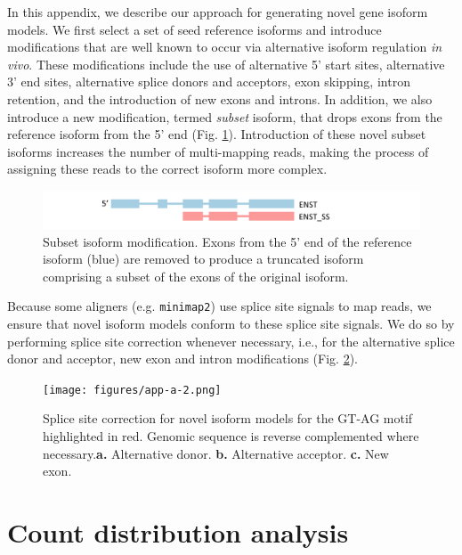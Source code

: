 In this appendix, we describe our approach for generating novel gene isoform models. We first select a set of seed reference isoforms and introduce modifications that are well known to occur via alternative isoform regulation \textit{in vivo}. These modifications include the use of alternative 5' start sites, alternative 3' end sites, alternative splice donors and acceptors, exon skipping, intron retention, and the introduction of new exons and introns. In addition, we also introduce a new modification, termed \textit{subset} isoform, that drops exons from the reference isoform from the 5' end (Fig. \ref{fig:app-a-1}). Introduction of these novel subset isoforms increases the number of multi-mapping reads, making the process of assigning these reads to the correct isoform more complex. 
\begin{figure}[H]
    \centering
    \includegraphics[width=\textwidth]{figures/app-a-1.png}
    \caption[Subset isoform modification]{Subset isoform modification. Exons from the 5' end of the reference isoform (blue) are removed to produce a truncated isoform comprising a subset of the exons of the original isoform.}
    \label{fig:app-a-1}
\end{figure}
Because some aligners (e.g. \texttt{minimap2}) use splice site signals to map reads, we ensure that novel isoform models conform to these splice site signals. We do so by performing splice site correction whenever necessary, i.e., for the alternative splice donor and acceptor, new exon and intron modifications (Fig. \ref{fig:app-a-2}). 
\begin{figure}[H]
    \centering
    \texttt{[image: figures/app-a-2.png]}
    \caption[Splice site correction for novel isoform models]{Splice site correction for novel isoform models for the GT-AG motif highlighted in red. Genomic sequence is reverse complemented where necessary.\textbf{a.} Alternative donor. \textbf{b.} Alternative acceptor. \textbf{c.} New exon.}
    \label{fig:app-a-2}
\end{figure}

\chapter{Count distribution analysis}\label{ap:count-dist}

